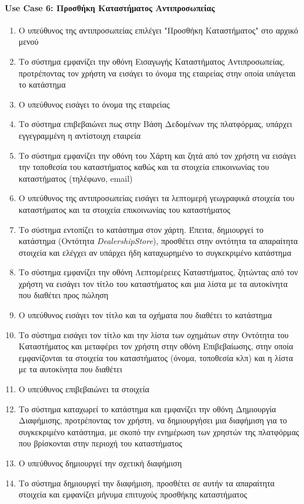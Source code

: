 \documentclass{../ol-softwaremanual}
\begin{document}
	
	\newpage
	\centering
	
	\paragraph{\en Use Case 6: \gr Προσθήκη Καταστήματος Αντιπροσωπείας}
	
	\begin{enumerate}
		\item Ο υπεύθυνος της αντιπροσωπείας επιλέγει \en"\gr Προσθήκη Καταστήματος\en" \gr στο αρχικό μενού
		\item Το σύστημα εμφανίζει την οθόνη Εισαγωγής Καταστήματος Αντιπροσωπείας, προτρέποντας τον χρήστη να εισάγει το όνομα της εταιρείας στην οποία υπάγεται το κατάστημα
		\item Ο υπεύθυνος εισάγει το όνομα της εταιρείας
		\item Το σύστημα επιβεβαιώνει πως στην Βάση Δεδομένων της πλατφόρμας, υπάρχει εγγεγραμμένη η αντίστοιχη εταιρεία
		\item Το σύστημα εμφανίζει την οθόνη του Χάρτη και ζητά από τον χρήστη να εισάγει την τοποθεσία του καταστήματος καθώς και τα στοιχεία επικοινωνίας του καταστήματος (τηλέφωνο, \en email\gr)
		\item Ο υπεύθυνος της αντιπροσωπείας εισάγει τα λεπτομερή γεωγραφικά στοιχεία του καταστήματος και τα στοιχεία επικοινωνίας του καταστήματος
		\item Το σύστημα εντοπίζει το κατάστημα στον χάρτη. Έπειτα, δημιουργεί το κατάστημα (Οντότητα \en \textit{DealershipStore}\gr), προσθέτει στην οντότητα τα απαραίτητα στοιχεία και ελέγχει αν υπάρχει ήδη καταχωρημένο το συγκεκριμένο κατάστημα
		\item Το σύστημα εμφανίζει την οθόνη Λεπτομέρειες Καταστήματος, ζητώντας από τον χρήστη να εισάγει τον τίτλο του καταστήματος και μια λίστα με τα αυτοκίνητα που διαθέτει προς πώληση
		\item Ο υπεύθυνος εισάγει τον τίτλο και τα οχήματα που διαθέτει το κατάστημα
		\item Το σύστημα εισάγει τον τίτλο και την λίστα των οχημάτων στην Οντότητα του Καταστήματος και  μεταφέρει τον χρήστη στην οθόνη Επιβεβαίωσης, στην οποία εμφανίζονται τα στοιχεία του καταστήματος (όνομα, τοποθεσία κλπ) και η λίστα με τα αυτοκίνητα που διαθέτει
		\item Ο υπεύθυνος επιβεβαιώνει τα στοιχεία
		\item Το σύστημα καταχωρεί το κατάστημα και εμφανίζει την οθόνη Δημιουργία Διαφήμισης, προτρέποντας τον χρήστη, να δημιουργήσει μια διαφήμιση για το συγκεκριμένο κατάστημα, με σκοπό την ενημέρωση των χρηστών της πλατφόρμας που βρίσκονται στην περιοχή του καταστήματος
		\item Ο υπεύθυνος δημιουργεί την σχετική διαφήμιση
		\item Το σύστημα δημιουργεί την διαφήμιση, προσθέτει σε αυτήν τα απαραίτητα στοιχεία και εμφανίζει μήνυμα επιτυχούς προσθήκης καταστήματος
	\end{enumerate}
	
\end{document}
